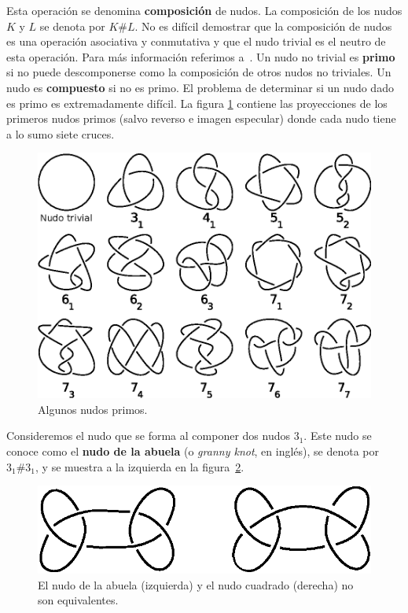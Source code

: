 \documentclass[graybox]{svmult}
\begin{document}
Esta operación se denomina \textbf{composición} de nudos. La composición de los
nudos $K$ y $L$ se denota por $K\#L$. No es difícil demostrar que la
composición de nudos es una operación asociativa y conmutativa y que el nudo
trivial es el neutro de esta operación.  Para más información referimos
a~\cite[\S1.2]{MR2079925}.  Un nudo no trivial es \textbf{primo} si no puede
descomponerse como la composición de otros nudos no triviales. Un nudo es
\textbf{compuesto} si no es primo.  El problema de determinar si un nudo dado
es primo es extremadamente difícil.  La figura \ref{fig:knots} contiene las
proyecciones de los primeros nudos primos (salvo reverso e imagen especular)
donde cada nudo tiene a lo sumo siete cruces. 
\begin{figure}[h]
	\centering
	\includegraphics[scale=0.7]{images/knots}
	\caption{Algunos nudos primos.}
	\label{fig:knots}
\end{figure}

\begin{example}
	Consideremos el nudo que se forma al componer dos nudos $3_1$. Este nudo se
	conoce como el \textbf{nudo de la abuela} (o \emph{granny knot}, en
	inglés), se denota por $3_1\#3_1$, y se muestra a la izquierda en la
	figura~\ref{fig:granny_and_square}.  
\end{example}

\begin{figure}[ht]
	\centering
	\includegraphics[scale=0.6]{images/grannyandsquare}
	\caption{El nudo de la abuela (izquierda) y el nudo cuadrado (derecha)
	no son equivalentes.}
	\label{fig:granny_and_square}
\end{figure}
\end{document}
